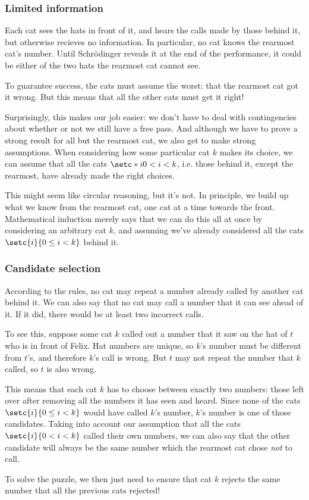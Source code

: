 \documentclass[10pt,a4paper]{scrartcl}
\begin{document}
\subsubsection{Limited information}

Each cat sees the hats in front of it, and hears the calls made by those behind
it, but otherwise recieves no information. In particular, no cat knows the
rearmost cat's number. Until Schr\"odinger reveals it at the end of the
performance, it could be either of the two hats the rearmost cat cannot see.

To guarantee success, the cats must assume the worst: that the rearmost cat got
it wrong. But this means that all the other cats must get it right!

Surprisingly, this makes our job easier: we don't have to deal with
contingencies about whether or not we still have a free pass. And although we
have to prove a strong result for all but the rearmost cat, we also get to make
strong assumptions. When considering how some particular cat $k$ makes its
choice, we can assume that all the cats $\setc*{i}{0 < i < k}$, i.e. those
behind it, except the rearmost, have already made the right choices.

This might seem like circular reasoning, but it's not. In principle, we build
up what we know from the rearmost cat, one cat at a time towards the front.
Mathematical induction merely says that we can do this all at once by
considering an arbitrary cat $k$, and assuming we've already considered all the
cats $\setc{i}{0 \leq i < k}$ behind it.

\subsubsection{Candidate selection}

According to the rules, no cat may repeat a number already called by another
cat behind it. We can also say that no cat may call a number that it can see
ahead of it. If it did, there would be at least two incorrect calls.

To see this, suppose some cat $k$ called out a number that it saw on the hat of
$t$ who is in front of Felix. Hat numbers are unique, so $k$'s number must be
different from $t$'s, and therefore $k$'s call is wrong. But $t$ may not repeat
the number that $k$ called, so $t$ is also wrong.

This means that each cat $k$ has to choose between exactly two numbers: those
left over after removing all the numbers it has seen and heard. Since none of
the cats $\setc{i}{0 \leq i < k}$ would have called $k$'s number, $k$'s number
is one of those candidates. Taking into account our assumption that all the
cats $\setc{i}{0 < i < k}$ called their own numbers, we can also say that the
other candidate will always be the same number which the rearmost cat chose
\emph{not} to call.

To solve the puzzle, we then just need to ensure that cat $k$ rejects the same
number that all the previous cats rejected!


\end{document}
